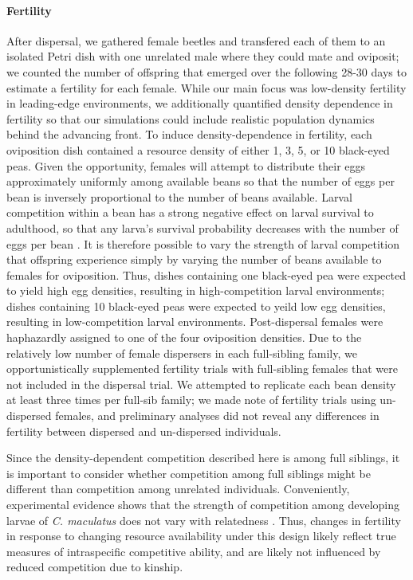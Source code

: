 \documentclass[11pt]{article}
\begin{document}
\paragraph{Fertility}
After dispersal, we gathered female beetles and transfered each of them to an isolated Petri dish with one unrelated male where they could mate and oviposit; we counted the number of offspring that emerged over the following 28-30 days to estimate a fertility for each female.
While our main focus was low-density fertility in leading-edge environments, we additionally quantified density dependence in fertility so that our simulations could include realistic population dynamics behind the advancing front.
To induce density-dependence in fertility, each oviposition dish contained a resource density of either 1, 3, 5, or 10 black-eyed peas.
Given the opportunity, females will attempt to distribute their eggs approximately uniformly among available beans \citep{fujii_behavioral_1990} so that the number of eggs per bean is inversely proportional to the number of beans available.
Larval competition within a bean has a strong negative effect on larval survival to adulthood, so that any larva's survival probability decreases with the number of eggs per bean \citep{giga_intraspecific_1991}.
It is therefore possible to vary the strength of larval competition that offspring experience simply by varying the number of beans available to females for oviposition.
Thus, dishes containing one black-eyed pea were expected to yield high egg densities, resulting in high-competition larval environments; dishes containing 10 black-eyed peas were expected to yeild low egg densities, resulting in low-competition larval environments.
Post-dispersal females were haphazardly assigned to one of the four oviposition densities.
Due to the relatively low number of female dispersers in each full-sibling family, we opportunistically supplemented fertility trials with full-sibling females that were not included in the dispersal trial.
We attempted to replicate each bean density at least three times per full-sib family; we made note of fertility trials using un-dispersed females, and preliminary analyses did not reveal any differences in fertility between dispersed and un-dispersed individuals.

Since the density-dependent competition described here is among full siblings, it is important to consider whether competition among full siblings might be different than competition among unrelated individuals.
Conveniently, experimental evidence shows that the strength of competition among developing larvae of \textit{C. maculatus} does not vary with relatedness \citep{smallegange_local_2008}.
Thus, changes in fertility in response to changing resource availability under this design likely reflect true measures of intraspecific competitive ability, and are likely not influenced by reduced competition due to kinship.
\end{document}
